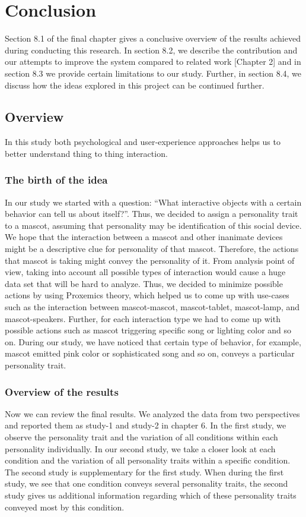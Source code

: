 \chapter{Conclusion}
\label{ch:conclusion}
Section 8.1 of the final chapter gives a conclusive overview of the results achieved during conducting this research.
In section 8.2, we describe the contribution and our attempts to improve the system compared to related
work [Chapter 2] and in section 8.3 we provide certain limitations to our study.
Further, in section 8.4, we discuss how the ideas explored in this project can be continued further.

\section{Overview}
\label{sec:overview}
In this study both psychological and user‐experience approaches helps us to better understand thing to thing interaction.

\subsection{The birth of the idea}
\label{subsec:the-birth-of-the-idea}
In our study we started with a question: “What interactive objects with a certain behavior can tell us about itself?”.
Thus, we decided to assign a personality trait to a mascot, assuming that personality
may be identification of this social device.
We hope that the interaction between a mascot and other inanimate devices might be a
descriptive clue for personality of that mascot.
Therefore, the actions that mascot is taking might convey the personality of it.
From analysis point of view, taking into account all possible types of interaction
would cause a huge data set that will be hard to analyze.
Thus, we decided to minimize
possible actions by using Proxemics theory, which helped us to come up with use-cases such
as the interaction between mascot-mascot, mascot-tablet, mascot-lamp, and mascot-speakers.
Further, for each interaction type we had to come up with possible actions such as mascot
triggering specific song or lighting color and so on.
During our study, we have noticed that
certain type of behavior, for example, mascot emitted pink color or
sophisticated song and so on, conveys a particular personality trait.

\subsection{Overview of the results}
\label{subsec:overview-of-the-results}
Now we can review the final results.
We analyzed the data from two perspectives and reported them as study-1 and study-2 in chapter 6.
In the first study, we observe the personality trait and the variation of all
conditions within each personality individually.
In our second study, we take a closer look at each condition and the variation of
all personality traits within a specific condition.
The second study is supplementary for the first study.
When during the first study, we see that one condition conveys several personality traits,
the second study gives us additional information regarding which of these personality
traits conveyed most by this condition.


